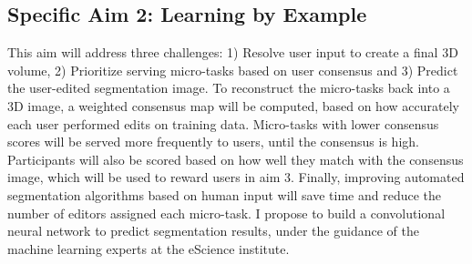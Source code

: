 
\subsection*{Specific Aim 2: Learning by Example}
This aim will address three challenges: 1) Resolve user input to create a final 3D volume, 2) Prioritize serving micro-tasks based on user consensus and 3) Predict the user-edited segmentation image. To reconstruct the micro-tasks back into a 3D image, a weighted consensus map will be computed, based on how accurately each user performed edits on training data. Micro-tasks with lower consensus scores will be served more frequently to users, until the consensus is high. Participants will also be scored based on how well they match with the consensus image, which will be used to reward users in aim 3. Finally, improving automated segmentation algorithms based on human input will save time and reduce the number of editors assigned each micro-task. I propose to build a convolutional neural network to predict segmentation results, under the guidance of the machine learning experts at the eScience institute. 

